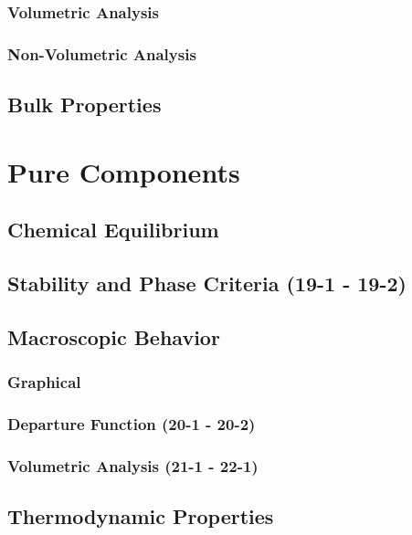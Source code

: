 \documentclass{mitqualif}
\begin{document}
\subsubsection{Volumetric Analysis}






\subsubsection{Non-Volumetric Analysis}





\subsection{Bulk Properties}
\section{Pure Components}
\subsection{Chemical Equilibrium}
\subsection{Stability and Phase Criteria (19-1 - 19-2)}


\subsection{Macroscopic Behavior}
\subsubsection{Graphical}
\subsubsection{Departure Function (20-1 - 20-2)}


\subsubsection{Volumetric Analysis (21-1 - 22-1)}


\subsection{Thermodynamic Properties}
\end{document}

